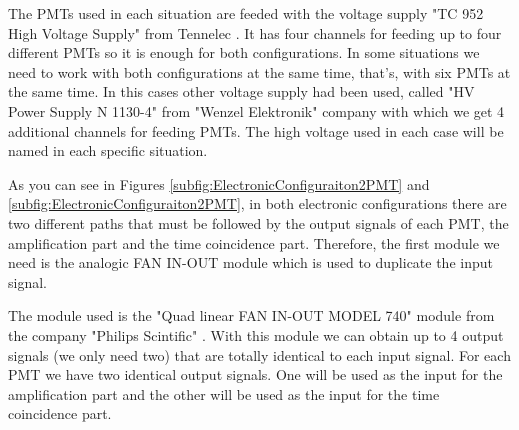 The PMTs used in each situation are feeded with the voltage supply "TC 952 High Voltage Supply" from Tennelec \cite{DataSheetHVSupplyTennelec}. It has four channels for feeding up to four different PMTs so it is enough for both configurations. In some situations we need to work with both configurations at the same time, that's, with six PMTs at the same time.  In this cases other voltage supply had been used, called  "HV Power Supply N 1130-4" from "Wenzel Elektronik" \cite{DataSheetHVSupplyWenzel} company with which we get 4 additional channels for feeding PMTs. The high voltage used in each case will be named in each specific situation.

As you can see in Figures \ref{subfig:ElectronicConfiguraiton2PMT} and \ref{subfig:ElectronicConfiguraiton2PMT}, in both electronic configurations there are two different paths that must be followed by the output signals of each PMT, the amplification part and the time coincidence part. Therefore, the first module we need is the analogic FAN IN-OUT module which is used to duplicate the input signal.

The module used is the "Quad linear FAN IN-OUT MODEL 740" module from the company "Philips Scintific" \cite{DataSheetFANINOUT}. With this module we can obtain up to 4 output signals (we only need two) that are totally identical to each input signal. For each PMT we have two identical output signals. One will be used as the input for the amplification part and the other will be used as the input for the time coincidence part.

